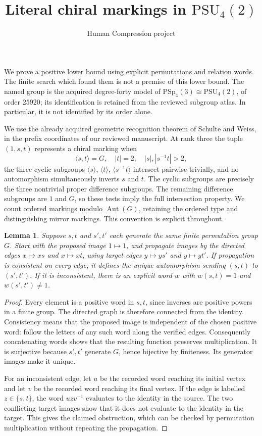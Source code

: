 \documentclass[11pt,a4paper]{article}
\title{Literal chiral markings in $\mathrm{PSU}_4(2)$}
\author{Human Compression project}\date{}
\newtheorem{lemma}{Lemma}
\newcommand{\Aut}{\operatorname{Aut}}
\begin{document}
\maketitle
We prove a positive lower bound using explicit permutations and relation
words. The finite search which found them is not a premise of this
lower bound. The named group is the acquired degree-forty model of
$\mathrm{PSp}_4(3)\cong\mathrm{PSU}_4(2)$, of order $25920$; its
identification is retained from the reviewed subgroup atlas. In
particular, it is not identified by its order alone.

We use the already acquired geometric recognition theorem of
Schulte and Weiss, in the prefix coordinates of our reviewed manuscript.
At rank three the tuple $(1,s,t)$ represents a chiral marking when
\[
 \langle s,t\rangle=G,\quad |t|=2,\quad |s|,|s^{-1}t|>2,
\]
the three cyclic subgroups $\langle s\rangle$, $\langle t\rangle$,
$\langle s^{-1}t\rangle$ intersect pairwise trivially, and no
automorphism simultaneously inverts $s$ and $t$.
The cyclic subgroups are precisely the three nontrivial proper
difference subgroups. The remaining difference subgroups are $1$ and
$G$, so these tests imply the full intersection property. We count
ordered markings modulo $\Aut(G)$, retaining the ordered type and
distinguishing mirror markings. This convention is explicit throughout.

\begin{lemma}\label{transport}
Suppose $s,t$ and $s',t'$ each generate the same finite permutation
group $G$. Start with the proposed image $1\mapsto1$, and propagate
images by the directed edges $x\mapsto xs$ and $x\mapsto xt$,
using target edges $y\mapsto ys'$ and $y\mapsto yt'$. If propagation
is consistent on every edge, it defines the unique automorphism
sending $(s,t)$ to $(s',t')$. If it is inconsistent, there is an
explicit word $w$ with $w(s,t)=1$ and $w(s',t')\ne1$.
\end{lemma}
\begin{proof}
Every element is a positive word in $s,t$, since inverses are positive
powers in a finite group. The directed graph is therefore connected
from the identity. Consistency means that the proposed image is
independent of the chosen positive word: follow the letters of any
such word along the verified edges. Consequently concatenating words
shows that the resulting function preserves multiplication. It is
surjective because $s',t'$ generate $G$, hence bijective by finiteness.
Its generator images make it unique.

For an inconsistent edge, let $u$ be the recorded word reaching its
initial vertex and let $v$ be the recorded word reaching its final
vertex. If the edge is labelled $z\in\{s,t\}$, the word
$uzv^{-1}$ evaluates to the identity in the source. The two conflicting
target images show that it does not evaluate to the identity in the
target. This gives the claimed obstruction, which can be checked by
permutation multiplication without repeating the propagation.
\end{proof}
\end{document}

